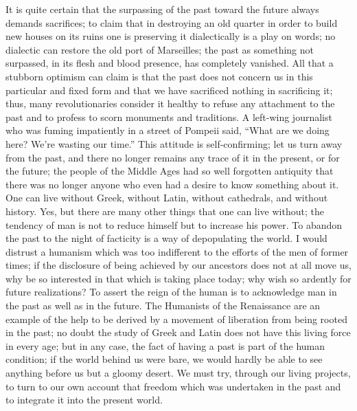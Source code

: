 \documentclass[11pt]{article}
\begin{document}
{{It is quite certain that the surpassing of the past toward the future always demands sacrifices; to claim that in destroying an old quarter in order to build new houses on its ruins one is preserving it dialectically is a play on words; no dialectic can restore the old port of Marseilles; the past as something not surpassed, in its flesh and blood presence, has completely vanished. All that a stubborn optimism can claim is that the past does not concern us in this particular and fixed form and that we have sacrificed nothing in sacrificing it; thus, many revolutionaries consider it healthy to refuse any attachment to the past and to profess to scorn monuments and traditions. A left-wing journalist who was fuming impatiently in a street of Pompeii said, “What are we doing here? We’re wasting our time.” This attitude is self-confirming; let us turn away from the past, and there no longer remains any trace of it in the present, or for the future; the people of the Middle Ages had so well forgotten antiquity that there was no longer anyone who even had a desire to know something about it. One can live without Greek, without Latin, without cathedrals, and without history. Yes, but there are many other things that one can live without; the tendency of man is not to reduce himself but to increase his power. To abandon the past to the night of facticity is a way of depopulating the world. I would distrust a humanism which was too indifferent to the efforts of the men of former times; if the disclosure of being achieved by our ancestors does not at all move us, why be so interested in that which is taking place today; why wish so ardently for future realizations? To assert the reign of the human is to acknowledge man in the past as well as in the future. The Humanists of the Renaissance are an example of the help to be derived by a movement of liberation from being rooted in the past; no doubt the study of Greek and Latin does not have this living force in every age; but in any case, the fact of having a past is part of the human condition; if the world behind us were bare, we would hardly be able to see anything before us but a gloomy desert. We must try, through our living projects, to turn to our own account that freedom which was undertaken in the past and to integrate it into the present world.

}}
\end{document}
